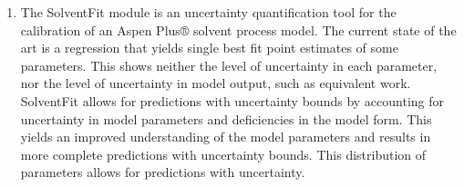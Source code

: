{\begin{enumerate}
		\item The SolventFit module is an uncertainty quantification tool for the calibration of an Aspen Plus® solvent process model. The current state of the art is a regression that yields single best fit point estimates of some parameters. This shows neither the level of uncertainty in each parameter, nor the level of uncertainty in model output, such as equivalent work. SolventFit allows for predictions with uncertainty bounds by accounting for uncertainty in model parameters and deficiencies in the model form. This yields an improved understanding of the model parameters and results in more complete predictions with uncertainty bounds. This distribution of parameters allows for predictions with uncertainty.
	\end{enumerate}
}

\renewcommand{\ccsirevisiontablecontent}{
	2016.06.00 & 06/22/2016 & 2016 June Bug Fix Release \\ \hline
	2016.04.00 & 04/29/2016 & 2016 April Bug Fix Release\\ \hline
	2016.02.00 & 02/29/2016 & 2016 February Bug Fix Release\\ \hline
	2015.10.00 & 11/20/2015 & 2015 November IAB Release\\ \hline
	2015.06.00 & 6/30/2015 & 2015 June Bug Fix Release\\ \hline
	2014.10.00 & 10/31/2014 & 2014 October IAB Release\\ \hline
}


	\makefrontmatter
	
	
	
	
	
	
	
	
	
	
	

